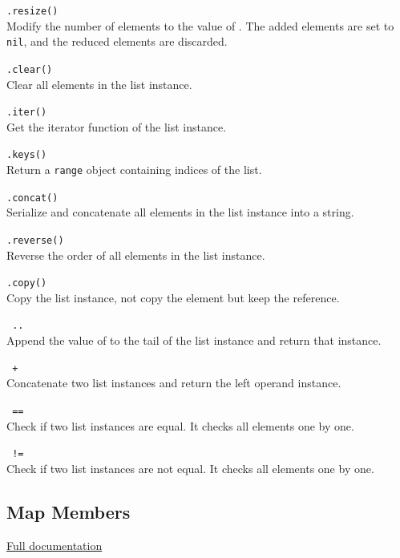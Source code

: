 \hangpar {}\texttt{.resize(}\texttt{)}\\
Modify the number of elements to the value of . The added elements are set to \texttt{nil}, and the reduced elements are discarded.

\hangpar {}\texttt{.clear()}\\
Clear all elements in the list instance.

\hangpar {}\texttt{.iter()}\\
Get the iterator function of the list instance.

\hangpar {}\texttt{.keys()}\\
Return a \texttt{range} object containing indices of the list.

\hangpar {}\texttt{.concat()}\\
Serialize and concatenate all elements in the list instance into a string.

\hangpar {}\texttt{.reverse()}\\
Reverse the order of all elements in the list instance.

\hangpar {}\texttt{.copy()}\\
Copy the list instance, not copy the element but keep the reference.

\hangpar {}\texttt{ .. }\\
Append the value of  to the tail of the list instance and return that instance.

\hangpar {}\texttt{ + }\\
Concatenate two list instances and return the left operand instance.

\hangpar {}\texttt{ == }\\
Check if two list instances are equal. It checks all elements one by one.

\hangpar {}\texttt{ != }\\
Check if two list instances are not equal. It checks all elements one by one.

\subsection*{Map Members}

\hangpar \href{https://berry.readthedocs.io/en/latest/source/en/Chapter-7.html\#map-class}{Full documentation}

